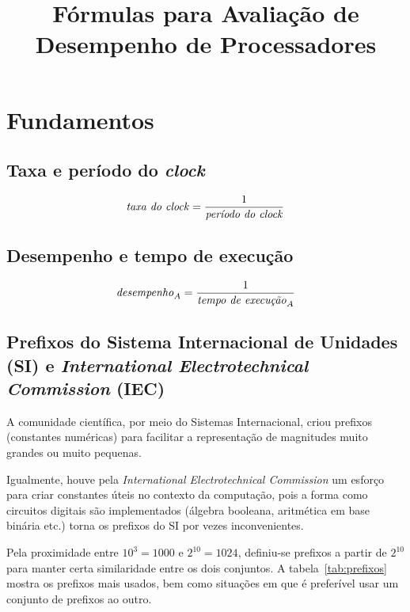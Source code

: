 \documentclass[12pt]{article}
\title{Fórmulas para Avaliação de Desempenho de Processadores}
\author{}
\date{}
\newcommand{\Text}[1]{\textrm{\textit{#1}}}
\begin{document}
\maketitle

\tableofcontents

\vspace*{\fill}

\doclicenseThis

\newpage


\section{Fundamentos}


\subsection{Taxa e período do \textit{clock}}

\[ \Text{taxa do clock} = \frac{1}{\Text{período do clock}} \]


\subsection{Desempenho e tempo de execução}

\[ \Text{desempenho}_A = \frac{1}{\Text{tempo de execução}_A} \]


\subsection[Prefixos do SI e IEC]{Prefixos do Sistema Internacional de Unidades (SI) e \textit{International Electrotechnical Commission} (IEC)}

A comunidade científica, por meio do Sistemas Internacional, criou prefixos (constantes numéricas) para facilitar a representação de magnitudes muito grandes ou muito pequenas.

Igualmente, houve pela \textit{International Electrotechnical Commission} um esforço para criar constantes úteis no contexto da computação, pois a forma como circuitos digitais são implementados (álgebra booleana, aritmética em base binária etc.) torna os prefixos do SI por vezes inconvenientes.

Pela proximidade entre $10^3=1000$ e $2^{10}=1024$, definiu-se prefixos a partir de $2^{10}$ para manter certa similaridade entre os dois conjuntos. A tabela~\ref{tab:prefixos} mostra os prefixos mais usados, bem como situações em que é preferível usar um conjunto de prefixos ao outro.
\end{document}
